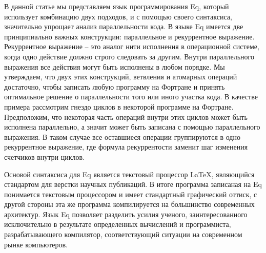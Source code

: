 \documentclass[a4paper]{llncs}
\begin{document}
В данной статье мы представляем язык программирования Eq, который
использует комбинацию двух подходов, и с помощью своего синтаксиса,
значительно упрощает анализ параллельности кода.  В языке Eq имеется
две принципиально важных конструкции: параллельное и рекуррентное
выражение.  Рекуррентное выражение -- это аналог нити исполнения в
операционной системе, когда одно действие должно строго следовать за
другим.  Внутри параллельного выражения все действия могут быть
исполнены в любом порядке.  Мы утверждаем, что двух этих конструкций,
ветвления и атомарных операций достаточно, чтобы записать любую
программу на Фортране и принять оптимальное решение о параллельности
того или иного участка кода.  В качестве примера рассмотрим гнездо
циклов в некоторой программе на Фортране.  Предположим, что некоторая
часть операций внутри этих циклов может быть исполнена параллельно, а
значит может быть записана с помощью параллельного выражения.  В таком
случае все оставшиеся операции группируются в одно рекуррентное
выражение, где формула рекуррентости заменит шаг изменения счетчиков
внутри циклов.

Основой синтаксиса для Eq является текстовый процессор \LaTeX,
являющийся стандартом для верстки научных публикаций.  В итоге
программа записаная на Eq понимается текстовым процессором и имеет
стандартный графический оттиск, с другой стороны эта же программа
компилируется на большинство современных архитектур.  Язык Eq
позволяет разделить усилия ученого, заинтересованного исключительно в
результате определенных вычислений и программиста, разрабатывающего
компилятор, соответствующий ситуации на современном рынке компьютеров.
\end{document}
